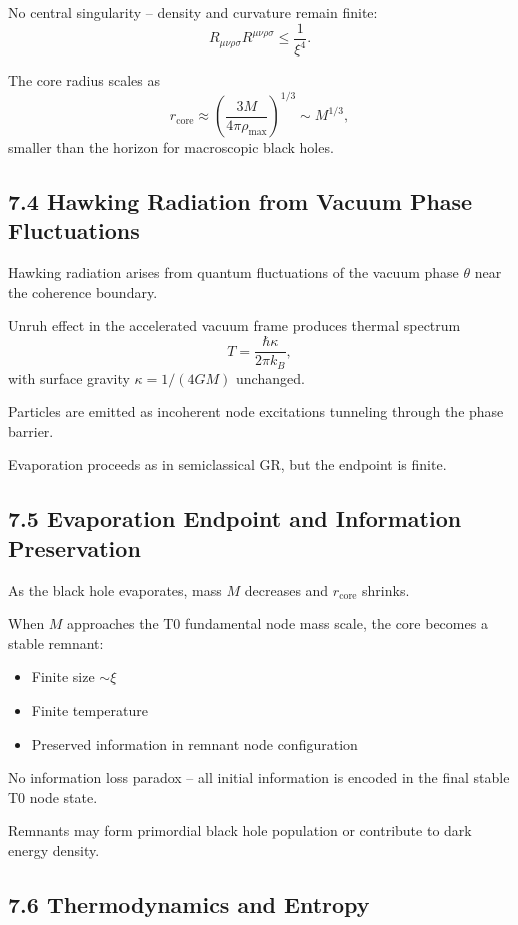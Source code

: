	No central singularity – density and curvature remain finite:
	\[
	R_{\mu\nu\rho\sigma} R^{\mu\nu\rho\sigma} \leq \frac{1}{\xi^4}.
	\]
	
	The core radius scales as
	\[
	r_{\text{core}} \approx \left(\frac{3M}{4\pi \rho_{\text{max}}}\right)^{1/3} \sim M^{1/3},
	\]
	smaller than the horizon for macroscopic black holes.
	
	\subsection{7.4 Hawking Radiation from Vacuum Phase Fluctuations}
	
	Hawking radiation arises from quantum fluctuations of the vacuum phase $\theta$ near the coherence boundary.
	
	Unruh effect in the accelerated vacuum frame produces thermal spectrum
	\[
	T = \frac{\hbar \kappa}{2\pi k_B},
	\]
	with surface gravity $\kappa = 1/(4GM)$ unchanged.
	
	Particles are emitted as incoherent node excitations tunneling through the phase barrier.
	
	Evaporation proceeds as in semiclassical GR, but the endpoint is finite.
	
	\subsection{7.5 Evaporation Endpoint and Information Preservation}
	
	As the black hole evaporates, mass $M$ decreases and $r_{\text{core}}$ shrinks.
	
	When $M$ approaches the T0 fundamental node mass scale, the core becomes a stable remnant:
	\begin{itemize}
		\item Finite size $\sim \xi$
		\item Finite temperature
		\item Preserved information in remnant node configuration
	\end{itemize}
	
	No information loss paradox – all initial information is encoded in the final stable T0 node state.
	
	Remnants may form primordial black hole population or contribute to dark energy density.
	
	\subsection{7.6 Thermodynamics and Entropy}
	
